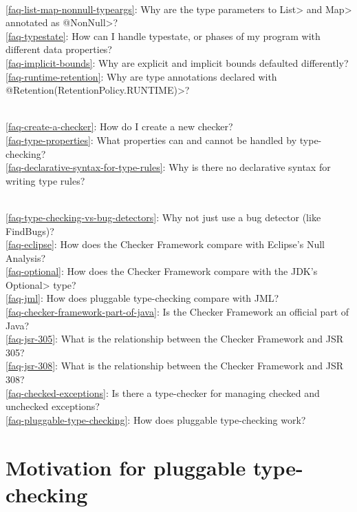 \\ \ref{faq-list-map-nonnull-typeargs}: Why are the type parameters to \<List> and \<Map> annotated as \<@NonNull>?
\\ \ref{faq-typestate}: How can I handle typestate, or phases of my program with different data properties?
\\ \ref{faq-implicit-bounds}: Why are explicit and implicit bounds defaulted differently?
\\ \ref{faq-runtime-retention}: Why are type annotations declared with \<@Retention(RetentionPolicy.RUNTIME)>?

\\ \ref{faq-create-a-checker}: How do I create a new checker?
\\ \ref{faq-type-properties}: What properties can and cannot be handled by type-checking?
\\ \ref{faq-declarative-syntax-for-type-rules}: Why is there no declarative syntax for writing type rules?

\\ \ref{faq-type-checking-vs-bug-detectors}: Why not just use a bug detector (like FindBugs)?
\\ \ref{faq-eclipse}: How does the Checker Framework compare with Eclipse's Null Analysis?
\\ \ref{faq-optional}: How does the Checker Framework compare with the JDK's \<Optional> type?
\\ \ref{faq-jml}: How does pluggable type-checking compare with JML?
\\ \ref{faq-checker-framework-part-of-java}: Is the Checker Framework an official part of Java?
\\ \ref{faq-jsr-305}: What is the relationship between the Checker Framework and JSR 305?
\\ \ref{faq-jsr-308}: What is the relationship between the Checker Framework and JSR 308?
\\ \ref{faq-checked-exceptions}: Is there a type-checker for managing checked and unchecked exceptions?
\\ \ref{faq-pluggable-type-checking}: How does pluggable type-checking work?


\section{Motivation for pluggable type-checking\label{faq-motivation-section}}

